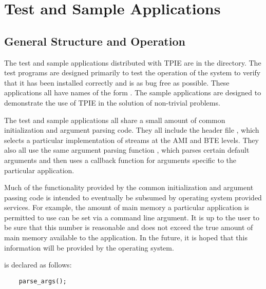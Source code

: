 \chapter{Test and Sample Applications}

\section{General Structure and Operation}

The test and sample applications distributed with TPIE are in the
 directory.  The test programs are designed primarily to
test the operation of the system to verify that it has been installed
correctly and is as bug free as possible.  These applications all have
names of the form .  The sample applications are designed
to demonstrate the use of TPIE in the solution of non-trivial
problems.

The test and sample applications all share a small amount of common
initialization and argument parsing code.  They all include the header file
, which selects a particular implementation of streams
at the AMI and BTE levels. They also all use the same argument parsing
function , which parses certain default arguments and
then uses a callback function for arguments specific to the particular
application.

Much of the functionality provided by the common initialization and
argument passing code is intended to eventually be subsumed by
operating system provided services.  For example, the amount of main
memory a particular application is permitted to use can be set via a
command line argument.  It is up to the user to be sure that this
number is reasonable and does not exceed the true amount of main
memory available to the application.  In the future, it is hoped that
this information will be provided by the operating system.

 is declared as follows:

\begin{verbatim}
    parse_args();
\end{verbatim}


